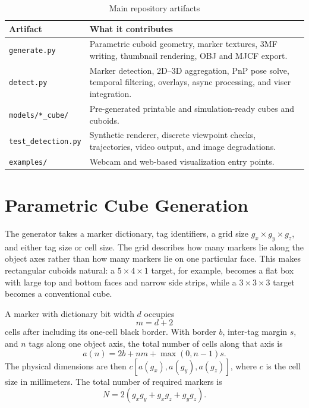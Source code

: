 \documentclass[conference]{IEEEtran}
\begin{document}
\begin{table}[t]
\caption{Main repository artifacts}
\label{tab:artifacts}
\centering
\begingroup
\footnotesize
\renewcommand{\arraystretch}{1.18}
\setlength{\tabcolsep}{4pt}
\begin{tabular}{@{}L{0.34\columnwidth}L{0.57\columnwidth}@{}}
\textbf{Artifact} & \textbf{What it contributes} \\
\hline
\texttt{generate.py} & Parametric cuboid geometry, marker textures, 3MF writing, thumbnail rendering, OBJ and MJCF export. \\
\texttt{detect.py} & Marker detection, 2D--3D aggregation, PnP pose solve, temporal filtering, overlays, async processing, and viser integration. \\
\texttt{models/*\_cube/} & Pre-generated printable and simulation-ready cubes and cuboids. \\
\texttt{test\_detection.py} & Synthetic renderer, discrete viewpoint checks, trajectories, video output, and image degradations. \\
\texttt{examples/} & Webcam and web-based visualization entry points. \\
\hline
\end{tabular}
\endgroup
\end{table}

\section{Parametric Cube Generation}
The generator takes a marker dictionary, tag identifiers, a grid size \(g_x \times g_y \times g_z\), and either tag size or cell size. The grid describes how many markers lie along the object axes rather than how many markers lie on one particular face. This makes rectangular cuboids natural: a \(5\times4\times1\) target, for example, becomes a flat box with large top and bottom faces and narrow side strips, while a \(3\times3\times3\) target becomes a conventional cube.

A marker with dictionary bit width \(d\) occupies
\begin{equation}
m = d + 2
\end{equation}
cells after including its one-cell black border. With border \(b\), inter-tag margin \(s\), and \(n\) tags along one object axis, the total number of cells along that axis is
\begin{equation}
a(n)=2b+nm+\max(0,n-1)s.
\end{equation}
The physical dimensions are then \(c[a(g_x),a(g_y),a(g_z)]\), where \(c\) is the cell size in millimeters. The total number of required markers is
\begin{equation}
N=2(g_xg_y+g_xg_z+g_yg_z).
\end{equation}
\end{document}
